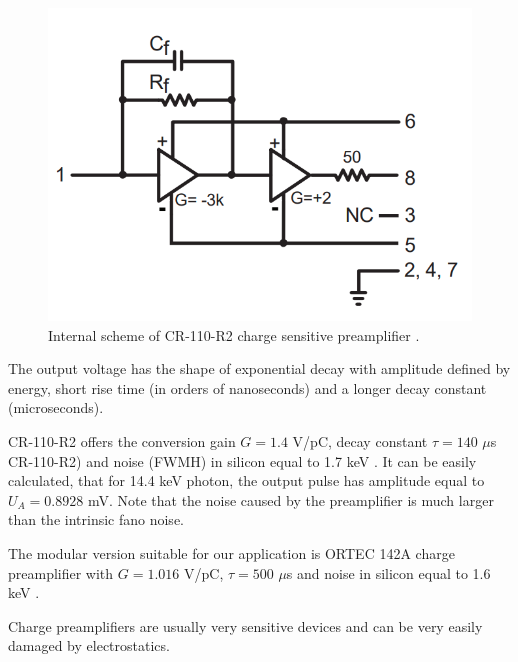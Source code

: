 \par

\begin{figure}[H]
 \centering
 \includegraphics[scale=0.35, angle = 0]{./pictures/CRpreamp.png}
 \caption{Internal scheme of CR-110-R2 charge sensitive preamplifier \cite{cr110}.}
 \label{internal}
 
\end{figure}

The output voltage has the shape of exponential decay with amplitude defined by energy, short rise time (in orders of nanoseconds) and a longer decay constant (microseconds).


CR-110-R2 offers the conversion gain $G = 1.4$ V/pC, decay constant $\tau = 140$ $\mu$s CR-110-R2) and noise (FWMH) in silicon equal to 1.7 keV \cite{cr110}. It can be easily calculated, that for 14.4 keV photon, the output pulse has amplitude equal to $U_{A} = 0.8928$ mV. 
Note that the noise caused by the preamplifier is much larger than the intrinsic fano noise.


\par
The modular version suitable for our application is ORTEC 142A charge preamplifier with $G = 1.016$ V/pC, $\tau = 500$ $\mu$s and noise in silicon equal to 1.6 keV \cite{ORTECpreamp}.  






\par

Charge preamplifiers are usually very sensitive devices and can be very easily damaged by electrostatics. 




